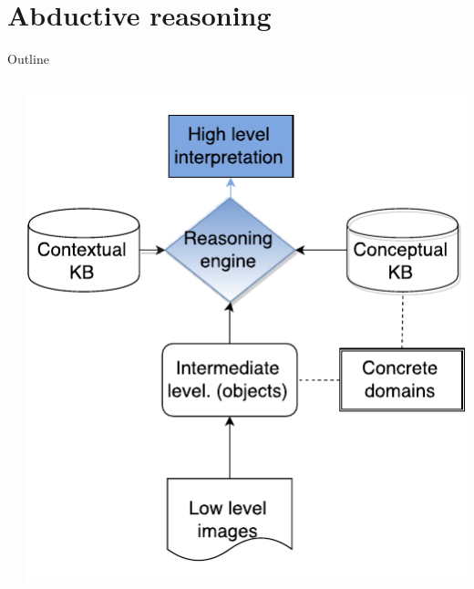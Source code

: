 \documentclass{beamer}
\begin{document}
\section{Abductive reasoning}
\begin{frame}{Outline}
\begin{columns}
 \begin{column}{0.6\textwidth}
  \tableofcontents[currentsection,hideothersubsections,subsectionstyle=show/shaded]
 \end{column}

 \begin{column}{.4\textwidth}
  \includegraphics[width=.9\textwidth]{images/flowchart_ar_crop.pdf}
 \end{column}
\end{columns}
\end{frame}
\end{document}
